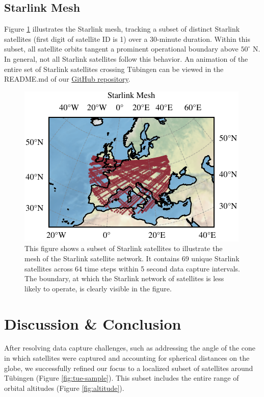 \documentclass{article}
\theoremstyle{plain}
\theoremstyle{definition}
\theoremstyle{remark}
\begin{document}
\subsection{Starlink Mesh}
Figure \ref{fig:mesh} illustrates the Starlink mesh, tracking a subset of distinct Starlink satellites (first digit of satellite ID is 1) over a 30-minute duration. Within this subset, all satellite orbits tangent a prominent operational boundary above $50^\circ$ N. In general, not all Starlink satellites follow this behavior. An animation of the entire set of Starlink satellites crossing Tübingen can be viewed in the README.md of our \href{https://github.com/timoluebbing/Satellites}{GitHub repository}.
\begin{figure}[h]
    \begin{center}
        \includegraphics{fig/starlink_mesh.pdf}
        \caption{This figure shows a subset of Starlink satellites to illustrate the mesh of the Starlink satellite network. It contains 69 unique Starlink satellites across 64 time steps within 5 second data capture intervals. The boundary, at which the Starlink network of satellites is less likely to operate, is clearly visible in the figure.}
        \label{fig:mesh}
    \end{center}
\end{figure}

\section{Discussion \& Conclusion}\label{sec:conclusion}
After resolving data capture challenges, such as addressing the angle of the cone in which satellites were captured and accounting for spherical distances on the globe, we successfully refined our focus to a localized subset of satellites around Tübingen (Figure \ref{fig:tue-sample}). This subset includes the entire range of orbital altitudes (Figure \ref{fig:altitude}). 
\end{document}
